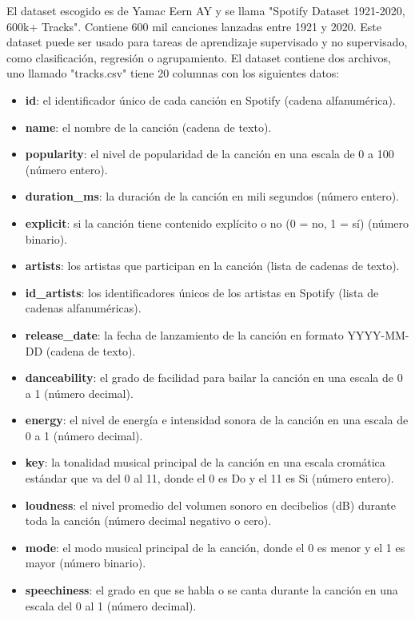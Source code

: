\documentclass{wsdcr}
\begin{document}
El dataset escogido es de Yamac Eern AY y se llama "Spotify Dataset 1921-2020, 600k+ Tracks". Contiene 600 mil canciones lanzadas entre 1921 y 2020. Este dataset puede ser usado para tareas de aprendizaje supervisado y no supervisado, como clasificación, regresión o agrupamiento. El dataset contiene dos archivos, uno llamado "tracks.csv" tiene 20 columnas con los siguientes datos:

\begin{itemize}
    \item \textbf{id}: el identificador único de cada canción en Spotify (cadena alfanumérica).
    \item \textbf{name}: el nombre de la canción (cadena de texto).
    \item \textbf{popularity}: el nivel de popularidad de la canción en una escala de 0 a 100 (número entero).
    \item \textbf{duration\_ms}: la duración de la canción en mili segundos (número entero).
    \item \textbf{explicit}: si la canción tiene contenido explícito o no (0 = no, 1 = sí) (número binario).
    \item \textbf{artists}: los artistas que participan en la canción (lista de cadenas de texto).
    \item \textbf{id\_artists}: los identificadores únicos de los artistas en Spotify (lista de cadenas alfanuméricas).
    \item \textbf{release\_date}: la fecha de lanzamiento de la canción en formato YYYY-MM-DD (cadena de texto).
    \item \textbf{danceability}: el grado de facilidad para bailar la canción en una escala de 0 a 1 (número decimal).
    \item \textbf{energy}: el nivel de energía e intensidad sonora de la canción en una escala de 0 a 1 (número decimal).
    \item \textbf{key}: la tonalidad musical principal de la canción en una escala cromática estándar que va del 0 al 11, donde el 0 es Do y el 11 es Si (número entero).
    \item \textbf{loudness}: el nivel promedio del volumen sonoro en decibelios (dB) durante toda la canción (número decimal negativo o cero).
    \item \textbf{mode}: el modo musical principal de la canción, donde el 0 es menor y el 1 es mayor (número binario).
    \item \textbf{speechiness}: el grado en que se habla o se canta durante la canción en una escala del 0 al 1 (número decimal).

\end{itemize}
\end{document}
